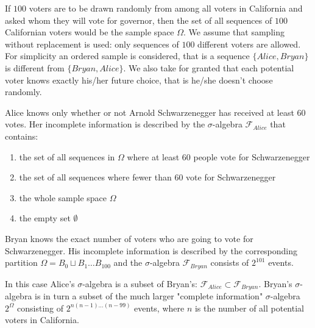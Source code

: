     \begin{example}[Voters]
      If $100$ voters are to be drawn randomly from among all voters in California and asked whom they will vote for governor, then the set of all sequences of $100$ Californian voters would be the sample space $\Omega$. We assume that sampling without replacement is used: only sequences of $100$ different voters are allowed. For simplicity an ordered sample is considered, that is a sequence $\{Alice, Bryan\}$ is different from $\{Bryan, Alice\}$. We also take for granted that each potential voter knows exactly his/her future choice, that is he/she doesn’t choose randomly.

      Alice knows only whether or not Arnold Schwarzenegger has received at least $60$ votes. Her incomplete information is described by the $\sigma$-algebra $\mathcal{F}_{Alice}$ that contains:
      \begin{enumerate}
        \item the set of all sequences in $\Omega$ where at least $60$ people vote for Schwarzenegger
        \item the set of all sequences where fewer than $60$ vote for Schwarzenegger
        \item the whole sample space $\Omega$
        \item the empty set $\emptyset$
      \end{enumerate}
      Bryan knows the exact number of voters who are going to vote for Schwarzenegger. His incomplete information is described by the corresponding partition $\Omega = B_0 \sqcup B_1 \ldots B_{100}$ and the $\sigma$-algebra $\mathcal{F}_{Bryan}$ consists of $2^{101}$ events. 

      In this case Alice’s $\sigma$-algebra is a subset of Bryan’s: $\mathcal{F}_{Alice} \subset \mathcal{F}_{Bryan}$. Bryan’s $\sigma$-algebra is in turn a subset of the much larger "complete information" $\sigma$-algebra $2^{\Omega}$ consisting of $2^{n(n-1)\ldots (n-99)}$ events, where $n$ is the number of all potential voters in California. 
    \end{example}

